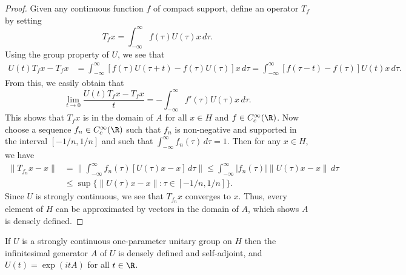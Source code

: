 \begin{proof}
Given any continuous function $f$ of compact support, define an operator $T_f$ by setting
\[T_f x=\int_{-\infty}^{\infty}f(\tau)U(\tau)x\,d\tau.\]
Using the group property of $U$, we see that
\begin{align*}
U(t)T_f x-T_f x&=\int_{-\infty}^{\infty}[f(\tau)U(\tau+t)-f(\tau)U(\tau)]x\,d\tau=\int_{-\infty}^{\infty}[f(\tau-t)-f(\tau)]U(t)x\,d\tau.
\end{align*}
From this, we easily obtain that
\[\lim_{t\to 0}\frac{U(t)T_fx-T_fx}{t}=-\int_{-\infty}^{\infty}f'(\tau)U(\tau)x\,d\tau.\]
This shows that $T_fx$ is in the domain of $A$ for all $x\in H$ and $f\in C^\infty_c(\R)$. Now choose a sequence $f_n\in C^\infty_c(\R)$ such that $f_n$ is non-negative and supported in the interval $[-1/n,1/n]$ and such that $\int_{-\infty}^{\infty}f_n(\tau)\,d\tau=1$. Then for any $x\in H$, we have
\begin{align*}
\|T_{f_n}x-x\|&=\Big\|\int_{-\infty}^{\infty}f_n(\tau)[U(\tau)x-x]\,d\tau\Big\|\leq\int_{-\infty}^{\infty}|f_n(\tau)|\|U(\tau)x-x\|\,d\tau\\
&\leq\sup\{\|U(\tau)x-x\|:\tau\in[-1/n,1/n]\}.
\end{align*}
Since $U$ is strongly continuous, we see that $T_{f_n}x$ converges to $x$. Thus, every element of $H$ can be approximated by vectors in the domain of $A$, which shows $A$ is densely defined.
\end{proof}
\begin{theorem}\label{Stone theorem}
If $U$ is a strongly continuous one-parameter unitary group on $H$ then the infinitesimal generator $A$ of $U$ is densely defined and self-adjoint, and $U(t)=\exp(itA)$ for all $t\in\R$.
\end{theorem}
